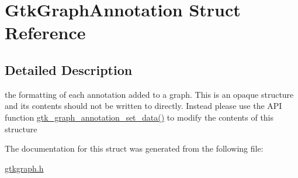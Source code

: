\hypertarget{struct_gtk_graph_annotation}{
\section{GtkGraphAnnotation Struct Reference}
\label{struct_gtk_graph_annotation}
}


\subsection{Detailed Description}
the formatting of each annotation added to a graph. This is an opaque structure and its contents should not be written to directly. Instead please use the API function \hyperlink{gtkgraph_8h_a2852248fc89a7b4d8df476663c48cefb}{gtk\_\-graph\_\-annotation\_\-set\_\-data()} to modify the contents of this structure 

The documentation for this struct was generated from the following file:\begin{DoxyCompactItemize}
\item 
\hyperlink{gtkgraph_8h}{gtkgraph.h}\end{DoxyCompactItemize}
